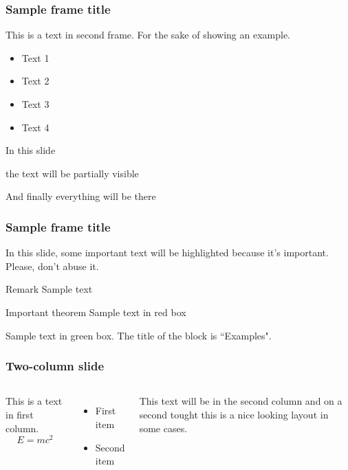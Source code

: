 \documentclass[aspectratio=169]{beamer}
\begin{document}
\begin{frame}
\frametitle{Sample frame title}
This is a text in second frame. For the sake of showing an example.

\begin{itemize}
    \item Text 1
    \item Text 2
    \item Text 3
    \item Text 4
\end{itemize}
\end{frame}


\begin{frame}
In this slide \pause

the text will be partially visible \pause

And finally everything will be there
\end{frame}


\begin{frame}
\frametitle{Sample frame title}

In this slide, some important text will be
\alert{highlighted} because it's important.
Please, don't abuse it.

\begin{block}{Remark}
Sample text
\end{block}

\begin{alertblock}{Important theorem}
Sample text in red box
\end{alertblock}

\begin{examples}
Sample text in green box. The title of the block is ``Examples".
\end{examples}
\end{frame}


\begin{frame}
\frametitle{Two-column slide}

\begin{columns}

This is a text in first column.
$$E=mc^2$$
\begin{itemize}
\item First item
\item Second item
\end{itemize}

This text will be in the second column
and on a second tought this is a nice looking
layout in some cases.
\end{columns}
\end{frame}
\end{document}
